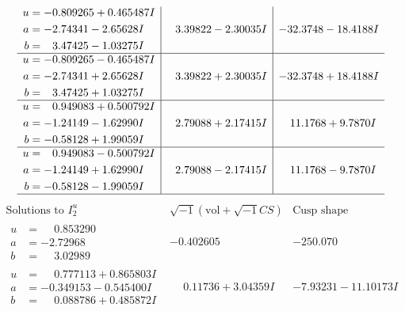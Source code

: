 \documentclass[1p]{elsarticle_modified}
\theoremstyle{definition}
\newcommand{\I}{\sqrt{-1}}
\begin{document}
$$\begin{array}{c|c|c}
\begin{aligned}
u &= -0.809265 + 0.465487 I \\
a &= -2.74341 - 2.65628 I \\
b &= \phantom{-}3.47425 - 1.03275 I\end{aligned}
 & \phantom{-}3.39822 - 2.30035 I & -32.3748 - 18.4188 I \\ \hline\begin{aligned}
u &= -0.809265 - 0.465487 I \\
a &= -2.74341 + 2.65628 I \\
b &= \phantom{-}3.47425 + 1.03275 I\end{aligned}
 & \phantom{-}3.39822 + 2.30035 I & -32.3748 + 18.4188 I \\ \hline\begin{aligned}
u &= \phantom{-}0.949083 + 0.500792 I \\
a &= -1.24149 - 1.62990 I \\
b &= -0.58128 + 1.99059 I\end{aligned}
 & \phantom{-}2.79088 + 2.17415 I & \phantom{-}11.1768 + 9.7870 I \\ \hline\begin{aligned}
u &= \phantom{-}0.949083 - 0.500792 I \\
a &= -1.24149 + 1.62990 I \\
b &= -0.58128 - 1.99059 I\end{aligned}
 & \phantom{-}2.79088 - 2.17415 I & \phantom{-}11.1768 - 9.7870 I\\
 \hline 
 \end{array}$$\newpage$$\begin{array}{c|c|c}  
\text{Solutions to }I^u_{2}& \I (\text{vol} + \sqrt{-1}CS) & \text{Cusp shape}\\
 \hline 
\begin{aligned}
u &= \phantom{-}0.853290\phantom{ +0.000000I} \\
a &= -2.72968\phantom{ +0.000000I} \\
b &= \phantom{-}3.02989\phantom{ +0.000000I}\end{aligned}
 & -0.402605\phantom{ +0.000000I} & -250.070\phantom{ +0.000000I} \\ \hline\begin{aligned}
u &= \phantom{-}0.777113 + 0.865803 I \\
a &= -0.349153 - 0.545400 I \\
b &= \phantom{-}0.088786 + 0.485872 I\end{aligned}
 & \phantom{-}0.11736 + 3.04359 I & -7.93231 - 11.10173 I \\ \hline\begin{aligned}

\end{aligned}
\end{array}$$
\end{document}
